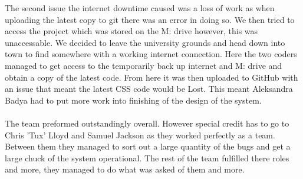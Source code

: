 \documentclass{project}
\begin{document}
The second issue the internet downtime caused was a loss of work as when uploading the latest copy to git there was an error in doing so. We then tried to access the project which was stored on the M: drive however, this was unaccessable. We decided to leave the university grounds and head down into town to find somewhere with a working internet connection. Here the two coders managed to get access to the temporarily back up internet and M: drive and obtain a copy of the latest code. From here it was then uploaded to GitHub with an issue that meant the latest CSS code would be Lost. This meant Aleksandra Badya had to put more work into finishing of the design of the system.  
\\
\\
The team preformed outstandingly overall. However special credit has to go to Chris 'Tux' Lloyd and Samuel Jackson as they worked perfectly as a team. Between them they managed to sort out a large quantity of the bugs and get a large chuck of the system operational. The rest of the team fulfilled there roles and more, they managed to do what was asked of them and more. 
\end{document}
